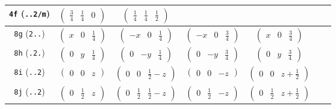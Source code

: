 \documentclass[fleqn,9pt,landscape]{jsarticle}
\begin{document}
\begin{center}
\begin{longtable}{ccccccc}
{\tt 4f} ({\tt ..2/m}) & $ \begin{pmatrix} \frac{3}{4} & \frac{1}{4} & 0 \end{pmatrix} $ & $ \begin{pmatrix} \frac{1}{4} & \frac{1}{4} & \frac{1}{2} \end{pmatrix} $ & $  $ & $  $ & $  $ & $  $ \\ \hline
{\tt 8g} ({\tt 2..}) & $ \begin{pmatrix} x & 0 & \frac{1}{4} \end{pmatrix} $ & $ \begin{pmatrix} - x & 0 & \frac{1}{4} \end{pmatrix} $ & $ \begin{pmatrix} - x & 0 & \frac{3}{4} \end{pmatrix} $ & $ \begin{pmatrix} x & 0 & \frac{3}{4} \end{pmatrix} $ & $  $ & $  $ \\ \hline
{\tt 8h} ({\tt .2.}) & $ \begin{pmatrix} 0 & y & \frac{1}{4} \end{pmatrix} $ & $ \begin{pmatrix} 0 & - y & \frac{1}{4} \end{pmatrix} $ & $ \begin{pmatrix} 0 & - y & \frac{3}{4} \end{pmatrix} $ & $ \begin{pmatrix} 0 & y & \frac{3}{4} \end{pmatrix} $ & $  $ & $  $ \\ \hline
{\tt 8i} ({\tt ..2}) & $ \begin{pmatrix} 0 & 0 & z \end{pmatrix} $ & $ \begin{pmatrix} 0 & 0 & \frac{1}{2} - z \end{pmatrix} $ & $ \begin{pmatrix} 0 & 0 & - z \end{pmatrix} $ & $ \begin{pmatrix} 0 & 0 & z + \frac{1}{2} \end{pmatrix} $ & $  $ & $  $ \\ \hline
{\tt 8j} ({\tt ..2}) & $ \begin{pmatrix} 0 & \frac{1}{2} & z \end{pmatrix} $ & $ \begin{pmatrix} 0 & \frac{1}{2} & \frac{1}{2} - z \end{pmatrix} $ & $ \begin{pmatrix} 0 & \frac{1}{2} & - z \end{pmatrix} $ & $ \begin{pmatrix} 0 & \frac{1}{2} & z + \frac{1}{2} \end{pmatrix} $ & $  $ & $  $ \\ \hline

\end{longtable}
\end{center}
\end{document}
